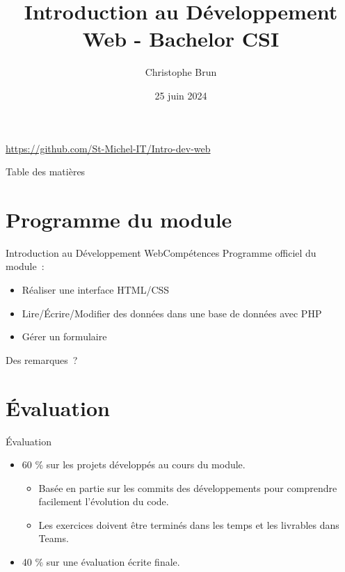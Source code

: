 \documentclass{beamer}
\title{Introduction au Développement Web - Bachelor CSI}
\author{Christophe Brun}
\institute{Campus Saint-Michel IT}
\date{25 juin 2024}
\begin{document}
    \begin{frame}
        \titlepage
        \bigbreak
        \centering
        \url{https://github.com/St-Michel-IT/Intro-dev-web}
    \end{frame}

    \begin{frame}{Table des matières}
        \tableofcontents
    \end{frame}


    \section{Programme du module}\label{sec:programme-du-module}
    \begin{frame}{Introduction au Développement Web}{Compétences}
        Programme officiel du module~:
        \begin{itemize}
            \item Réaliser une interface HTML/CSS
            \item Lire/Écrire/Modifier des données dans une base de données avec PHP
            \item Gérer un formulaire
        \end{itemize}
        \bigbreak
        Des remarques~?
    \end{frame}


    \section{Évaluation}\label{sec:evaluation}
    \begin{frame}{Évaluation}
        \begin{itemize}
            \item 60 \% sur les projets développés au cours du module.
            \begin{itemize}
                \item Basée en partie sur les commits des développements pour comprendre facilement l'évolution du code.
                \item Les exercices doivent être terminés dans les temps et les livrables dans Teams.
            \end{itemize}
            \item 40 \% sur une évaluation écrite finale.
        \end{itemize}
    \end{frame}
\end{document}
